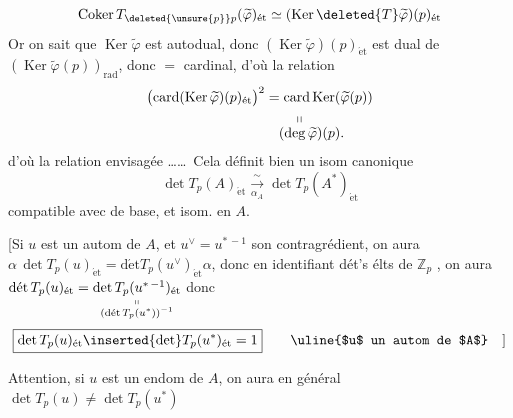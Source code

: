 \[
\operatorname{Coker}T_{\deleted{\unsure{p}}p}(\widetilde\varphi)_{\mathrm{\acute et}}\simeq
(\operatorname{Ker}\deleted{T}\widetilde\varphi)(p)_{\mathrm{\acute et}}
\]
Or on sait que $\operatorname{Ker}\widetilde\varphi$ est autodual, donc
$(\operatorname{Ker}\widetilde\varphi)(p)_{\mathrm{\acute et}}$ est dual de $(\operatorname{Ker}\widetilde\varphi(p))_{\mathrm{rad}}$, donc
 $=$ cardinal, d'où la relation
\[
\begin{aligned}
\bigl(\operatorname{card}(\operatorname{Ker}\widetilde\varphi)(p)_{\mathrm{\acute et}}\bigr)^2
&=\operatorname{card}\operatorname{Ker}(\widetilde\varphi(p))\\
&\hspace{2em}\shortparallel\\[-1ex]
&\quad(\deg\widetilde\varphi)(p).
\end{aligned}
\]
d'où la relation envisagée \ldots\ldots\ Cela définit
bien un isom canonique
\[
\boxed{\det T_p(A)_{\mathrm{\acute et}}\xrightarrow[\alpha_A]{\sim}\det T_p(A^*)_{\mathrm{\acute et}}}\tag*{(*)}
\]
compatible avec  de base, et isom. en $A$.

[Si $u$ est un autom de $A$, et $u^\vee=u^{*\, -1}$ son
contragrédient, on aura $\alpha\,\det T_p(u)_{\mathrm{\acute et}}=\operatorname{d\acute et}T_p(u^\vee)_{\mathrm{\acute et}}\alpha$,
donc en identifiant  dét's  élts de
$\mathbb Z_p$ , on aura
$\operatorname{d\acute et}T_p(u)_{\mathrm{\acute et}}=\underset{\substack{\shortparallel\\(\operatorname{d\acute et}T_p(u^*))^{-1}}}{\operatorname{det}T_p(u^{*\, -1})_{\mathrm{\acute et}}}$
donc
\[
\boxed{\det T_p(u)_{\mathrm{\acute et}}\inserted{\det}T_p(u^*)_{\mathrm{\acute et}}=1}
\qquad\text{\uline{$u$ un autom de $A$}} \quad]
\]

Attention, si $u$ est un endom de $A$, on aura
en général $\det T_p(u)\ne\det T_p(u^*)$
